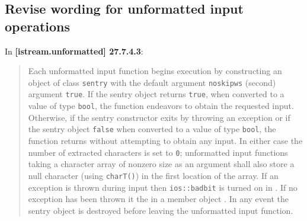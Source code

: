 \documentclass{wg21}
\begin{document}
\subsection{Revise wording for unformatted input operations}
In \textbf{[istream.unformatted] 27.7.4.3}:
\begin{quote}
Each unformatted input function begins execution by constructing  an object of
class \texttt{sentry} with the default argument \texttt{noskipws} (second)
argument \texttt{true}. If the sentry object returns \texttt{true}, when
converted to a value of type \texttt{bool}, the function endeavors to obtain
the requested input. Otherwise, if the sentry constructor exits by throwing an
exception or if the sentry object  \texttt{false}\removed{,} when converted to a
value of type \texttt{bool}, the function returns without attempting to obtain
any input. In either case the number of extracted characters is set to \texttt{0};
unformatted input functions taking a character array of nonzero size as an
argument shall also store a null character (using \texttt{charT()}) in the
first location of the array.  If an exception is
thrown during input then \texttt{ios::badbit} is turned on in .  If no exception has been thrown it
 the  in a member object .
 In any event the sentry object is destroyed before
leaving the unformatted input function.
\end{quote}
\end{document}
